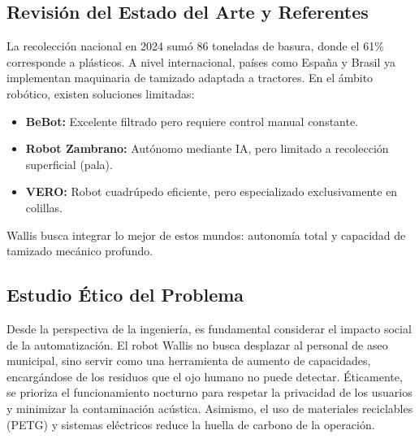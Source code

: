 \begin{center}
\end{center}

\subsection{Revisión del Estado del Arte y Referentes}
La recolección nacional en 2024 sumó 86 toneladas de basura, donde el 61\% corresponde a plásticos. A nivel internacional, países como España y Brasil ya implementan maquinaria de tamizado adaptada a tractores. En el ámbito robótico, existen soluciones limitadas:
\begin{itemize}
	\item \textbf{BeBot:} Excelente filtrado pero requiere control manual constante.
	\item \textbf{Robot Zambrano:} Autónomo mediante IA, pero limitado a recolección superficial (pala).
	\item \textbf{VERO:} Robot cuadrúpedo eficiente, pero especializado exclusivamente en colillas.
\end{itemize}
Wallis busca integrar lo mejor de estos mundos: autonomía total y capacidad de tamizado mecánico profundo.

\subsection{Estudio Ético del Problema}
Desde la perspectiva de la ingeniería, es fundamental considerar el impacto social de la automatización. El robot Wallis no busca desplazar al personal de aseo municipal, sino servir como una herramienta de aumento de capacidades, encargándose de los residuos que el ojo humano no puede detectar. Éticamente, se prioriza el funcionamiento nocturno para respetar la privacidad de los usuarios y minimizar la contaminación acústica. Asimismo, el uso de materiales reciclables (PETG) y sistemas eléctricos reduce la huella de carbono de la operación.


